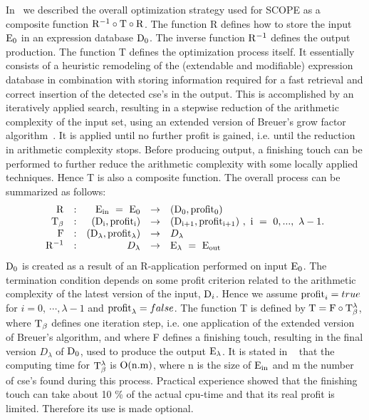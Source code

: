 In~\cite{vanHulzen:81,vanHulzen:83} we described the overall
optimization strategy used for
SCOPE as a composite function ${{\rm R}^{-1}} \circ {{\rm T}} 
\circ {{\rm R}}$.  The function R defines how to store the input
${{\rm E}}_{0}$ in an expression database ${{\rm D}}_{0}$.
The inverse function ${{\rm R}}^{{-1}}$ defines the output production.  
The function T defines the
optimization process itself. It essentially consists of a heuristic
remodeling of the (extendable and modifiable) expression database  
in combination with storing information required for a fast 
retrieval and correct insertion of the detected cse's in the output.  
This is accomplished by an iteratively
applied search, resulting in a stepwise reduction of the arithmetic
complexity of the input set, using an extended version of Breuer's
grow factor algorithm~\cite{Breuer:69,vanHulzen:81,vanHulzen:83}.
It is applied until no further profit
is gained, i.e. until the reduction in arithmetic complexity stops.
Before producing output, a finishing touch can be performed to further
reduce the arithmetic complexity with some locally applied techniques.
Hence T is also a composite function.
The overall process can be summarized as follows: 
\[ \begin{array}{rcrcl}
{\rm R} & : & {\rm E_{in}}~=~{\rm E_0} & \rightarrow & ({\rm D_0},{\rm profit_0}) \\
{\rm T_{\beta}} & : & ({\rm D_i},{\rm profit_i}) & \rightarrow & ({\rm D_{i+1}},
{\rm profit_{i+1}})~,~{\rm i}~=~0,...,~\lambda - 1.  \\
{\rm F} & : & ({\rm D_{\lambda}},{\rm profit_{\lambda}}) & \rightarrow & {D_{\lambda}}\\
{\rm R^{-1}} & : & {D_{\lambda}} & \rightarrow & {\rm E_{\lambda}}~=~{\rm E_{out}}
\end{array} \]
 ${\rm D_0}$ is created as a result of an R-application performed on 
input ${\rm E_0}$. The termination condition depends on some profit criterion
related to the arithmetic complexity of the latest version of the
input, ${{{\rm D}}_i}$. Hence we assume ${{{\rm profit}}_i} = true$
for $i =0,~\cdots , \lambda -1$ and ${{{\rm profit}}_\lambda} =
false$.  The function T is defined 
by ${\rm T} = {\rm F} \circ {\rm T_{\beta}^{\lambda}}$, where 
${{\rm T}}_{\beta}$ defines one iteration step, i.e. one application of the
extended version of Breuer's algorithm, and where F defines a
finishing touch, resulting in the final version $D_{\lambda}$ of
${{\rm D}}_{0}$, used to produce the output ${{\rm E}}_{\lambda}$. 
It is stated in ~\cite{vanHulzen:83} that the computing time for
${\rm T_{\beta}^{\lambda}}$ is ${\rm O(n.m)}$, where n is the size 
of ${\rm E_{in}}$ and m the number of cse's found during this process.
Practical experience showed that the finishing touch can take about 
10 \% of the actual cpu-time and that its real profit is limited. 
Therefore its use is made optional. 

